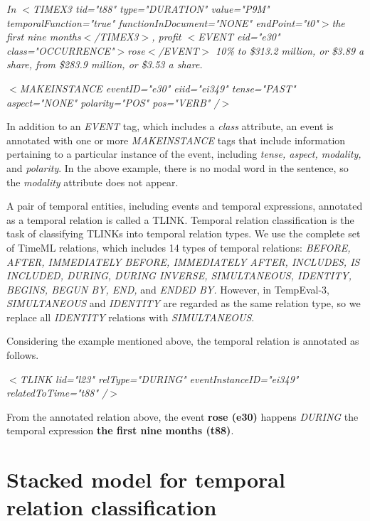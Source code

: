 \documentclass[english]{jnlp_1.4}
\begin{document}
\begin{framed}
\textit{\small In $<$TIMEX3 tid="t88" type="DURATION" value="P9M" temporalFunction="true" functionInDocument="NONE" endPoint="t0"$>$the first nine months$<$/TIMEX3$>$, profit $<$EVENT eid="e30" class="OCCURRENCE"$>$rose$<$/EVENT$>$ 10\% to \$313.2 million, or \$3.89 a share, from \$283.9 million, or \$3.53 a share.}

\textit{\small $<$MAKEINSTANCE eventID="e30" eiid="ei349" tense="PAST" aspect="NONE" polarity="POS" pos="VERB" /$>$}
\end{framed}

In addition to an \textit{\small EVENT} tag, which includes a \textit{class} attribute, an event is annotated with one or more \textit{\small MAKEINSTANCE} tags that include information pertaining to a particular instance of the event, including \textit{tense, aspect, modality,} and \textit{polarity}. 
In the above example, there is no modal word in the sentence, so the \textit{modality} attribute does not appear.

A pair of temporal entities, including events and temporal expressions, annotated as a temporal relation is called a TLINK.
Temporal relation classification is the task of classifying TLINKs into temporal relation types.
We use the complete set of TimeML relations, which includes 14 types of temporal relations: 
\emph{{\footnotesize BEFORE, AFTER, IMMEDIATELY BEFORE, IMMEDIATELY AFTER, INCLUDES, IS INCLUDED, DURING, DURING INVERSE, SIMULTANEOUS, IDENTITY, BEGINS, BEGUN BY, END,}} and \emph{{\footnotesize ENDED BY.}}
However, in TempEval-3, \emph{\footnotesize SIMULTANEOUS} and \emph{\footnotesize IDENTITY} are regarded as the same relation type, so we replace all \emph{\footnotesize IDENTITY} relations with \emph{\footnotesize SIMULTANEOUS}.

Considering the example mentioned above, the temporal relation is annotated as follows.

\begin{framed}
\textit{\small $<$TLINK lid="l23" relType="DURING" eventInstanceID="ei349" relatedToTime="t88"  /$>$}
\end{framed}

From the annotated relation above, the event \textbf{rose (e30)} happens \textit{\footnotesize DURING} the temporal expression \textbf{the first nine months (t88)}.


\section{Stacked model for temporal relation classification}
\label{sec:timefeat}
\end{document}
